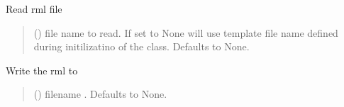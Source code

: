 \documentclass[letterpaper,10pt,english]{sphinxmanual}
\begin{document}
\begin{fulllineitems}
\begin{fulllineitems}
\label{\detokenize{API:raypyng.rml.RMLFile.read}}
\pysigstartsignatures
\pysiglinewithargsret
{}
{}
{}
\pysigstopsignatures
\sphinxAtStartPar
Read rml file
\begin{quote}\begin{description}
\sphinxAtStartPar
{} (\sphinxstyleliteralemphasis{\sphinxupquote{, }}) \textendash{} file name to read.
If set to None will use template file name defined during
initilizatino of the class. Defaults to None.

\end{description}\end{quote}

\end{fulllineitems}


\begin{fulllineitems}
\label{\detokenize{API:raypyng.rml.RMLFile.write}}
\pysigstartsignatures
\pysiglinewithargsret
{}
{}
{}
\pysigstopsignatures
\sphinxAtStartPar
Write the rml to 
\begin{quote}\begin{description}
\sphinxAtStartPar
{} (\sphinxstyleliteralemphasis{\sphinxupquote{, }}) \textendash{} filename . Defaults to None.

\end{description}\end{quote}

\end{fulllineitems}


\end{fulllineitems}
\end{document}
